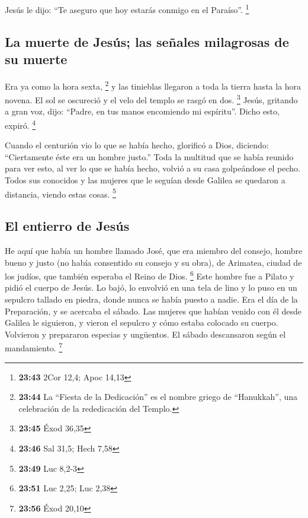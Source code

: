  Jesús le dijo: ``Te aseguro que hoy estarás conmigo en
el Paraíso''. \footnote{\textbf{23:43} 2Cor 12,4; Apoc 14,13}

\hypertarget{la-muerte-de-jesuxfas-las-seuxf1ales-milagrosas-de-su-muerte}{%
\subsection{La muerte de Jesús; las señales milagrosas de su
muerte}\label{la-muerte-de-jesuxfas-las-seuxf1ales-milagrosas-de-su-muerte}}

 Era ya como la hora sexta, \footnote{\textbf{23:44} La
  ``Fiesta de la Dedicación'' es el nombre griego de ``Hanukkah'', una
  celebración de la rededicación del Templo.} y las tinieblas llegaron a
toda la tierra hasta la hora novena.  El sol se oscureció
y el velo del templo se rasgó en dos. \footnote{\textbf{23:45} Éxod
  36,35}  Jesús, gritando a gran voz, dijo: ``Padre, en
tus manos encomiendo mi espíritu''. Dicho esto, expiró. \footnote{\textbf{23:46}
  Sal 31,5; Hech 7,58}

 Cuando el centurión vio lo que se había hecho, glorificó
a Dios, diciendo: ``Ciertamente éste era un hombre justo.''
 Toda la multitud que se había reunido para ver esto, al
ver lo que se había hecho, volvió a su casa golpeándose el pecho.
 Todos sus conocidos y las mujeres que le seguían desde
Galilea se quedaron a distancia, viendo estas cosas. \footnote{\textbf{23:49}
  Luc 8,2-3}

\hypertarget{el-entierro-de-jesuxfas}{%
\subsection{El entierro de Jesús}\label{el-entierro-de-jesuxfas}}

 He aquí que había un hombre llamado José, que era
miembro del consejo, hombre bueno y justo  (no había
consentido su consejo y su obra), de Arimatea, ciudad de los judíos, que
también esperaba el Reino de Dios. \footnote{\textbf{23:51} Luc 2,25;
  Luc 2,38}  Este hombre fue a Pilato y pidió el cuerpo
de Jesús.  Lo bajó, lo envolvió en una tela de lino y lo
puso en un sepulcro tallado en piedra, donde nunca se había puesto a
nadie.  Era el día de la Preparación, y se acercaba el
sábado.  Las mujeres que habían venido con él desde
Galilea le siguieron, y vieron el sepulcro y cómo estaba colocado su
cuerpo.  Volvieron y prepararon especias y ungüentos. El
sábado descansaron según el mandamiento. \footnote{\textbf{23:56} Éxod
  20,10}


